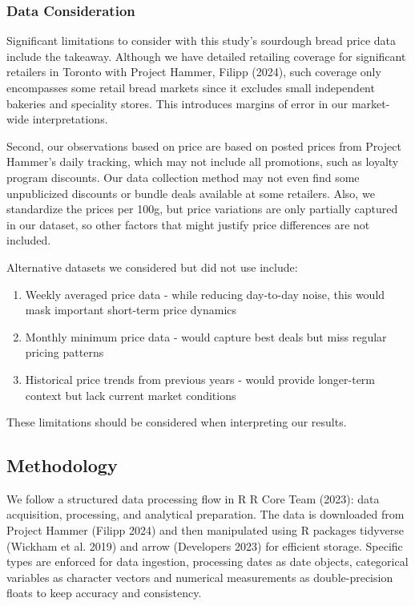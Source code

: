 \documentclass[
  letterpaper,
  DIV=11,
  numbers=noendperiod]{scrartcl}
\begin{document}
\subsubsection{Data Consideration}\label{data-consideration}

Significant limitations to consider with this study's sourdough bread
price data include the takeaway. Although we have detailed retailing
coverage for significant retailers in Toronto with Project Hammer,
Filipp (2024), such coverage only encompasses some retail bread markets
since it excludes small independent bakeries and speciality stores. This
introduces margins of error in our market-wide interpretations.

Second, our observations based on price are based on posted prices from
Project Hammer's daily tracking, which may not include all promotions,
such as loyalty program discounts. Our data collection method may not
even find some unpublicized discounts or bundle deals available at some
retailers. Also, we standardize the prices per 100g, but price
variations are only partially captured in our dataset, so other factors
that might justify price differences are not included.

Alternative datasets we considered but did not use include:

\begin{enumerate}
\def\labelenumi{\arabic{enumi}.}
\item
  Weekly averaged price data - while reducing day-to-day noise, this
  would mask important short-term price dynamics
\item
  Monthly minimum price data - would capture best deals but miss regular
  pricing patterns
\item
  Historical price trends from previous years - would provide
  longer-term context but lack current market conditions
\end{enumerate}

These limitations should be considered when interpreting our results.

\subsection{Methodology}\label{methodology}

We follow a structured data processing flow in R R Core Team (2023):
data acquisition, processing, and analytical preparation. The data is
downloaded from Project Hammer (Filipp 2024) and then manipulated using
R packages tidyverse (Wickham et al. 2019) and arrow (Developers 2023)
for efficient storage. Specific types are enforced for data ingestion,
processing dates as date objects, categorical variables as character
vectors and numerical measurements as double-precision floats to keep
accuracy and consistency.
\end{document}
